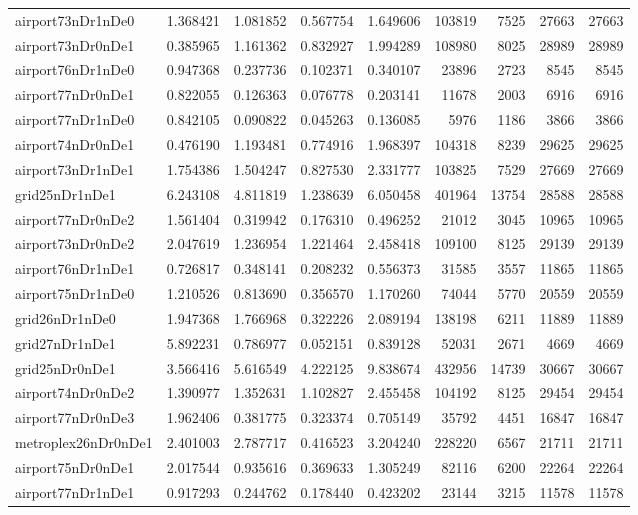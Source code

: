 \begin{longtable}{|l|r|r|r|r|r|r|r|r|}
airport73nDr1nDe0 & 1.368421 & 1.081852 & 0.567754 & 1.649606 & 103819 & 7525 & 27663 & 27663 \\
airport73nDr0nDe1 & 0.385965 & 1.161362 & 0.832927 & 1.994289 & 108980 & 8025 & 28989 & 28989 \\
airport76nDr1nDe0 & 0.947368 & 0.237736 & 0.102371 & 0.340107 & 23896 & 2723 & 8545 & 8545 \\
airport77nDr0nDe1 & 0.822055 & 0.126363 & 0.076778 & 0.203141 & 11678 & 2003 & 6916 & 6916 \\
airport77nDr1nDe0 & 0.842105 & 0.090822 & 0.045263 & 0.136085 & 5976 & 1186 & 3866 & 3866 \\
airport74nDr0nDe1 & 0.476190 & 1.193481 & 0.774916 & 1.968397 & 104318 & 8239 & 29625 & 29625 \\
airport73nDr1nDe1 & 1.754386 & 1.504247 & 0.827530 & 2.331777 & 103825 & 7529 & 27669 & 27669 \\
grid25nDr1nDe1 & 6.243108 & 4.811819 & 1.238639 & 6.050458 & 401964 & 13754 & 28588 & 28588 \\
airport77nDr0nDe2 & 1.561404 & 0.319942 & 0.176310 & 0.496252 & 21012 & 3045 & 10965 & 10965 \\
airport73nDr0nDe2 & 2.047619 & 1.236954 & 1.221464 & 2.458418 & 109100 & 8125 & 29139 & 29139 \\
airport76nDr1nDe1 & 0.726817 & 0.348141 & 0.208232 & 0.556373 & 31585 & 3557 & 11865 & 11865 \\
airport75nDr1nDe0 & 1.210526 & 0.813690 & 0.356570 & 1.170260 & 74044 & 5770 & 20559 & 20559 \\
grid26nDr1nDe0 & 1.947368 & 1.766968 & 0.322226 & 2.089194 & 138198 & 6211 & 11889 & 11889 \\
grid27nDr1nDe1 & 5.892231 & 0.786977 & 0.052151 & 0.839128 & 52031 & 2671 & 4669 & 4669 \\
grid25nDr0nDe1 & 3.566416 & 5.616549 & 4.222125 & 9.838674 & 432956 & 14739 & 30667 & 30667 \\
airport74nDr0nDe2 & 1.390977 & 1.352631 & 1.102827 & 2.455458 & 104192 & 8125 & 29454 & 29454 \\
airport77nDr0nDe3 & 1.962406 & 0.381775 & 0.323374 & 0.705149 & 35792 & 4451 & 16847 & 16847 \\
metroplex26nDr0nDe1 & 2.401003 & 2.787717 & 0.416523 & 3.204240 & 228220 & 6567 & 21711 & 21711 \\
airport75nDr0nDe1 & 2.017544 & 0.935616 & 0.369633 & 1.305249 & 82116 & 6200 & 22264 & 22264 \\
airport77nDr1nDe1 & 0.917293 & 0.244762 & 0.178440 & 0.423202 & 23144 & 3215 & 11578 & 11578 \\

\end{longtable}
